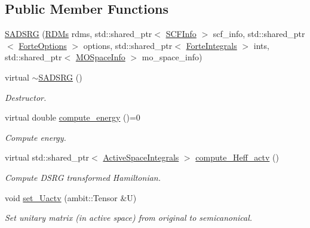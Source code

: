 \subsection*{Public Member Functions}
\begin{DoxyCompactItemize}
\item 
\mbox{\hyperlink{classforte_1_1_s_a_d_s_r_g_a4adeef4774904ed48bd108b25bc98f60}{S\+A\+D\+S\+RG}} (\mbox{\hyperlink{classforte_1_1_r_d_ms}{R\+D\+Ms}} rdms, std\+::shared\+\_\+ptr$<$ \mbox{\hyperlink{classforte_1_1_s_c_f_info}{S\+C\+F\+Info}} $>$ scf\+\_\+info, std\+::shared\+\_\+ptr$<$ \mbox{\hyperlink{classforte_1_1_forte_options}{Forte\+Options}} $>$ options, std\+::shared\+\_\+ptr$<$ \mbox{\hyperlink{classforte_1_1_forte_integrals}{Forte\+Integrals}} $>$ ints, std\+::shared\+\_\+ptr$<$ \mbox{\hyperlink{classforte_1_1_m_o_space_info}{M\+O\+Space\+Info}} $>$ mo\+\_\+space\+\_\+info)
\item 
virtual \mbox{\hyperlink{classforte_1_1_s_a_d_s_r_g_a3a874387ea0b249517ef85220a9f13f8}{$\sim$\+S\+A\+D\+S\+RG}} ()
\begin{DoxyCompactList}\small\item\em Destructor. \end{DoxyCompactList}\item 
virtual double \mbox{\hyperlink{classforte_1_1_s_a_d_s_r_g_aa3716848c396b296b99fff8d48751fd8}{compute\+\_\+energy}} ()=0
\begin{DoxyCompactList}\small\item\em Compute energy. \end{DoxyCompactList}\item 
virtual std\+::shared\+\_\+ptr$<$ \mbox{\hyperlink{classforte_1_1_active_space_integrals}{Active\+Space\+Integrals}} $>$ \mbox{\hyperlink{classforte_1_1_s_a_d_s_r_g_afd26cf60145a7e46f65fb07f44e93021}{compute\+\_\+\+Heff\+\_\+actv}} ()
\begin{DoxyCompactList}\small\item\em Compute D\+S\+RG transformed Hamiltonian. \end{DoxyCompactList}\item 
void \mbox{\hyperlink{classforte_1_1_s_a_d_s_r_g_a82c69af117c93f676a583f1b68976d87}{set\+\_\+\+Uactv}} (ambit\+::\+Tensor \&U)
\begin{DoxyCompactList}\small\item\em Set unitary matrix (in active space) from original to semicanonical. \end{DoxyCompactList}\end{DoxyCompactItemize}

